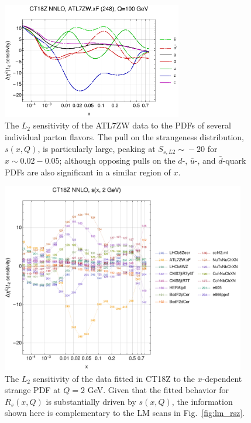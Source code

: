 \begin{figure}[tb]
\includegraphics[width=0.7\textwidth]{./fig/AXZ/248_ct18znn_L2_q100_Sf_1.pdf}
\vspace{-2ex}
\caption{
	The $L_2$ sensitivity of the ATL7ZW data to the PDFs of
	several individual parton flavors. The pull on the strangeness distribution,
	$s(x,Q)$, is particularly large, peaking at $S_{s,\mathit{L2}}\! \sim\! -20$
	for $x\!\sim\! 0.02-0.05$; although opposing pulls on the $d$-, $\bar{u}$-,
	and $\bar{d}$-quark PDFs are also significant in a similar region of $x$.
}
\label{fig:L2_248}
\end{figure}


\begin{figure}[htbp]
        \begin{center}
                \includegraphics[width=0.95\textwidth]{./fig/Sens/ifl3_ct18znn_L2_q2_Sf_1.pdf}
        \end{center}
        \vspace{-2ex}
        \caption{
		The $L_2$ sensitivity of the data fitted in CT18Z to the $x$-dependent
		strange PDF at $Q\!=2$ GeV. Given that the fitted behavior for
		$R_s(x,Q)$ is substantially driven by $s(x,Q)$, the information
		shown here is complementary to the LM scans in Fig.~\ref{fig:lm_rsz}.
        }
\label{fig:L2sZ}
\end{figure}

